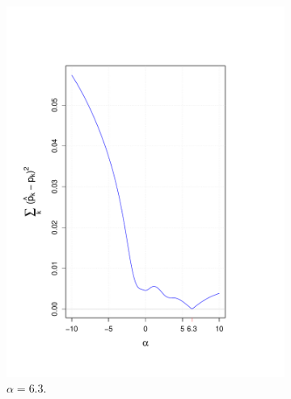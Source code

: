 \documentclass[10pt]{article}
\begin{document}
\begin{figure}[H]
\begin{subfigure}{.25\textwidth}
  \includegraphics[width=\linewidth]{alpha_trace_6_3.pdf}
  \caption{ $\alpha = 6.3$.}
  \label{fig: alpha_positive}
\end{subfigure}%
\begin{subfigure}{.25\textwidth}
  \centering

\end{subfigure}
\end{figure}
\end{document}
